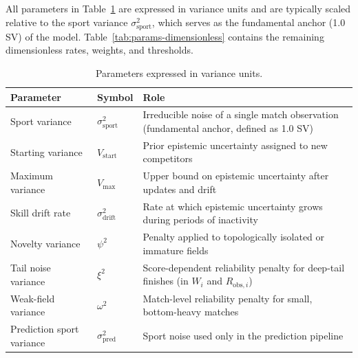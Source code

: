 \documentclass[12pt]{article}
\newcommand{\ssport}{\sigma_{\mathrm{sport}}^2}      %
\newcommand{\vstart}{V_{\mathrm{start}}}
\newcommand{\vmax}{V_{\mathrm{max}}}
\newcommand{\sdrift}{\sigma_{\mathrm{drift}}^2}
\newcommand{\psii}{\psi^2}
\newcommand{\xii}{\xi^2}
\newcommand{\omegai}{\omega^2}
\newcommand{\spred}{\sigma_{\mathrm{pred}}^2}
\begin{document}
	All parameters in Table~\ref{tab:params-variance} are expressed in variance units and are typically scaled relative to the sport variance \(\ssport\), which serves as the fundamental anchor (1.0 SV) of the model. Table~\ref{tab:params-dimensionless} contains the remaining dimensionless rates, weights, and thresholds.

	\begin{table}[htbp]
		\centering
		\caption{Parameters expressed in variance units.}
		\label{tab:params-variance}
		\begin{tabular}{llp{7cm}}
			\toprule
			\textbf{Parameter} & \textbf{Symbol} & \textbf{Role} \\
			\midrule
			Sport variance & \(\ssport\) & Irreducible noise of a single match observation (fundamental anchor, defined as 1.0 SV) \\
			Starting variance & \(\vstart\) & Prior epistemic uncertainty assigned to new competitors \\
			Maximum variance & \(\vmax\) & Upper bound on epistemic uncertainty after updates and drift \\
			Skill drift rate & \(\sdrift\) & Rate at which epistemic uncertainty grows during periods of inactivity \\
			Novelty variance & \(\psii\) & Penalty applied to topologically isolated or immature fields \\
			Tail noise variance & \(\xii\) & Score-dependent reliability penalty for deep-tail finishes (in \(W_i\) and \(R_{\mathrm{obs},i}\)) \\
			Weak-field variance & \(\omegai\) & Match-level reliability penalty for small, bottom-heavy matches \\
			Prediction sport variance & \(\spred\) & Sport noise used only in the prediction pipeline \\
			\bottomrule
		\end{tabular}
	\end{table}
\end{document}
